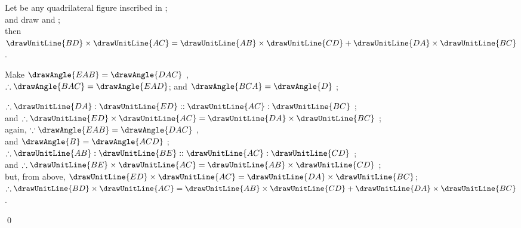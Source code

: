 \documentclass[booklanguage=english]{byrnebook}
\begin{document}
\begin{center}
Let  be any quadrilateral figure inscribed in ;\\
and draw  and ;\\
then $\drawUnitLine{BD} \times \drawUnitLine{AC} = \drawUnitLine{AB} \times \drawUnitLine{CD} + \drawUnitLine{DA} \times \drawUnitLine{BC}$.

Make $\drawAngle{EAB} = \drawAngle{DAC}$ ,\\
$\therefore \drawAngle{BAC} = \drawAngle{EAD}$; and $\drawAngle{BCA} = \drawAngle{D}$ ;

$\therefore \drawUnitLine{DA} : \drawUnitLine{ED} :: \drawUnitLine{AC} : \drawUnitLine{BC}$ ;\\
and $\therefore \drawUnitLine{ED} \times \drawUnitLine{AC} = \drawUnitLine{DA} \times \drawUnitLine{BC}$ ;\\
again, $\because \drawAngle{EAB} = \drawAngle{DAC}$ \byref{\constref},\\ %
and $\drawAngle{B} = \drawAngle{ACD}$ ;\\
$\therefore \drawUnitLine{AB} : \drawUnitLine{BE} :: \drawUnitLine{AC} : \drawUnitLine{CD}$ ;\\
and $\therefore \drawUnitLine{BE} \times \drawUnitLine{AC} = \drawUnitLine{AB} \times \drawUnitLine{CD}$ ;\\
but, from above, $\drawUnitLine{ED} \times \drawUnitLine{AC} = \drawUnitLine{DA} \times \drawUnitLine{BC}$;\\
$\therefore \drawUnitLine{BD} \times \drawUnitLine{AC} = \drawUnitLine{AB} \times \drawUnitLine{CD} + \drawUnitLine{DA} \times \drawUnitLine{BC}$ .
\end{center}

\qed

\tableofcontents
\end{document}
